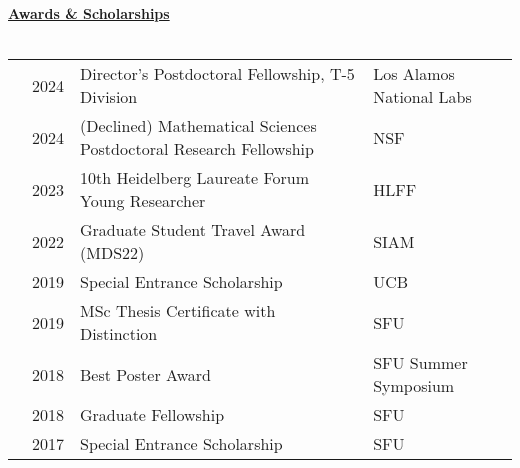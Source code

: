 \documentclass[letterpaper,11pt,oneside]{article}
\newcommand{\headr}[1]{\vspace{10pt}\uline{\Large{\textbf{#1}} \hfill } \\ \vspace{-10pt}\\}
\begin{document}



\headr{Awards \& Scholarships}

\begin{tabular}{@{} p{0.00cm} p{1cm} p{9cm} p{8cm}}
& 2024 & Director's Postdoctoral Fellowship, T-5 Division & Los Alamos National Labs \\
& 2024 & (Declined) Mathematical Sciences Postdoctoral Research Fellowship & NSF \\
& 2023 & 10th Heidelberg Laureate Forum Young Researcher & HLFF \\
& 2022 & Graduate Student Travel Award (MDS22) & SIAM \\
& 2019 & Special Entrance Scholarship & UCB \\
& 2019 & MSc Thesis Certificate with Distinction & SFU \\
& 2018 & Best Poster Award & SFU Summer Symposium \\
& 2018 & Graduate Fellowship & SFU \\
& 2017 & Special Entrance Scholarship & SFU \\
\end{tabular}
\end{document}
